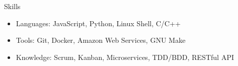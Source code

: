 \documentclass[print]{mcdowellcv}
\begin{document}
	\begin{cvsection}{Skills}
		\begin{cvsubsection}{}{}{}	
			\begin{itemize}
				\item Languages: JavaScript, Python, Linux Shell, C/C++
				\item Tools: Git, Docker, Amazon Web Services, GNU Make
				\item Knowledge: Scrum, Kanban, Microservices, TDD/BDD, RESTful API
			\end{itemize}
		\end{cvsubsection}
	\end{cvsection}
\end{document}
